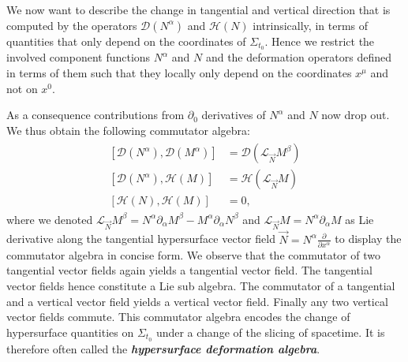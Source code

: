 \documentclass[a4paper,12pt, DIV=14, BCOR=5mm, twoside, headsepline]{scrbook}
\begin{document}
We now want to describe the change in tangential and vertical direction that is computed by the operators $\mathcal{D}(N^{\alpha})$ and $\mathcal{H}(N)$ intrinsically, in terms of quantities that only depend on the coordinates of $\Sigma_{t_0}$.
Hence we restrict the involved component functions $N^{\alpha}$ and $N$ and the deformation operators defined in terms of them such that they locally only depend on the coordinates $x^{\mu}$ and not on $x^0$.

As a consequence contributions from $\partial_0$ derivatives of $N^{\alpha}$ and $N$ now drop out.
We thus obtain the following commutator algebra: 
\begin{align}\label{Alg}
    \begin{aligned}
    \left[ \mathcal{D}(N^{\alpha}), \mathcal{D}(M^{\alpha}) \right] &= \mathcal{D}(\mathcal{L}_{\vec{N}}M^{\beta}) \\
    \left[ \mathcal{D}(N^{\alpha}), \mathcal{H}(M) \right] &= \mathcal{H}(\mathcal{L}_{\vec{N}}M)\\
    \left[ \mathcal{H}(N), \mathcal{H}(M) \right] &= 0,
    \end{aligned}
\end{align}
where we denoted $\mathcal{L}_{\Vec{N}}M^{\beta} = N^\alpha \partial_{\alpha}M^{\beta} - M^{\alpha} \partial_{\alpha} N^{\beta}$ and $\mathcal{L}_{\Vec{N}}M = N^{\alpha} \partial_{\alpha} M$ as Lie derivative along the tangential hypersurface vector field $\vec{N} = N^{\alpha} \frac{\partial}{\partial x^{\alpha}}$ to display the commutator algebra in concise form.
We observe that the commutator of two tangential vector fields again yields a tangential vector field. The tangential vector fields hence constitute a Lie sub algebra. 
The commutator of a tangential and a vertical vector field yields a vertical vector field.
Finally any two vertical vector fields commute. This commutator algebra encodes the change of hypersurface quantities on $\Sigma_{t_0}$ under a change of the slicing of spacetime. It is therefore often called the \textit{\textbf{hypersurface deformation algebra}}.\\
\end{document}
